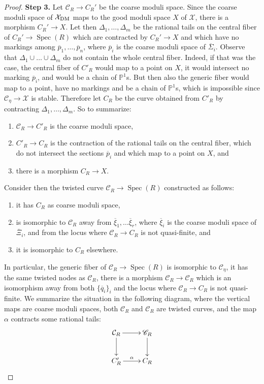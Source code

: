 \documentclass{amsart}
\newcommand{\bP}{\mathbb{P}}
\newcommand{\sC}{\mathscr{C}}
\newcommand{\cC}{\mathcal{C}}
\newcommand{\cX}{\mathcal{X}}
\newcommand{\spec}{\operatorname{Spec}}
\newcommand{\dm}{{\rm DM}}
\theoremstyle{definition}
\theoremstyle{definition}
\begin{document}
{\begin{proof}
    \textbf{Step 3.} Let $\cC_R\to C_R'$ be the coarse moduli space. Since the coarse moduli space of $\cX_{\dm}$ maps to the good moduli space $X$ of $\cX$, there is a morphism $C_R'\to X$. Let then $\Delta_1,\ldots,\Delta_m$ be the rational tails on the central fiber of $C_R'\to \spec(R)$ which are contracted by $C_R'\to X$ and which have no markings among $\overline{p}_1,\ldots, \overline{p}_n$, where $\overline{p}_i$ is the coarse moduli space of $\overline{\Sigma}_i$. 
    Observe that $\Delta_1\cup\ldots\cup \Delta_m$ do not contain the whole central fiber. Indeed, if that was the case, the central fiber of $C'_R$ would map to a point on $X$, it would intersect no marking $\overline{p}_i$, and would be a chain of $\bP^1$s. But then also the generic fiber would map to a point, have no markings and be a chain of $\bP^1$s, which is impossible since $\sC_\eta\to \cX$ is stable. Therefore let $C_R$ be the curve obtained from $C'_R$ by contracting $\Delta_1,\ldots,\Delta_m$. So to summarize:
    \begin{enumerate}
        \item[(i)] $\cC_R\to C'_R$ is the coarse moduli space,
        \item[(ii)] $C'_R\to C_R$ is the contraction of the rational tails on the central fiber, which do not intersect the sections $\overline{p}_i$ and which map to a point on $X$, and
        \item[(iii)] there is a morphism $C_R\to X$.
    \end{enumerate}Consider then the twisted curve $\sC_R\to \spec(R)$ constructed as follows:
    \begin{enumerate}
        \item it has $C_R$ as coarse moduli space,
        \item is isomorphic to $\cC_R$ away from $\overline{\xi}_1,\ldots \overline{\xi}_r$, where $\overline{\xi}_i$ is the coarse moduli space of $\overline{\Xi}_i$, and from the locus where $\cC_R\to C_R$ is not quasi-finite, and 
        \item it is isomorphic to $C_R$ elsewhere.
    \end{enumerate}
    In particular, the generic fiber of $\sC_R\to \spec(R)$ is isomorphic to $\sC_\eta$, it has the same twisted nodes as $\cC_R$, there is a morphism $\cC_R\to \sC_R$ which is an isomorphism away from both $\{\overline{q}_i\}_i$ and the locus where $\cC_R\to C_R$ is not quasi-finite. We summarize the situation in the following diagram, where the vertical maps are coarse moduli spaces, both $\cC_R$ and $\sC_R$ are twisted curves, and the map $\alpha$ contracts some rational tails:
    \[
    \xymatrix{\cC_R\ar[d] \ar[r] & \sC_R\ar[d] \\ C'_R\ar[r]^{\alpha} & C_R}
    \]


\end{proof}}
\end{document}

